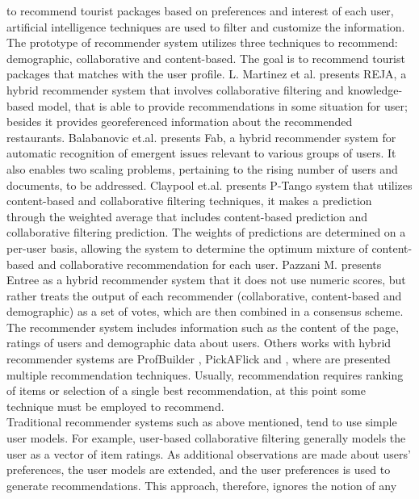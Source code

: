 to recommend tourist packages  based on preferences and interest 
of each user, artificial intelligence
techniques are used to filter and customize the information. The
prototype of recommender system utilizes three techniques to
recommend: demographic, collaborative and content-based. The goal is
to recommend tourist packages that matches with the user profile.
L. Martinez et al.\cite{martinez2009reja} presents REJA, a hybrid
recommender system that involves collaborative filtering and
knowledge-based model, that is able to provide recommendations in some
situation for user; besides it provides georeferenced information
about the recommended restaurants.
Balabanovic et.al.\cite{balabanovic1997fab} presents
Fab, a hybrid recommender system for automatic recognition of
emergent issues relevant to various groups of users. It also enables
two scaling problems, pertaining to the rising number of users and
documents, to be addressed. Claypool et.al.\cite{claypool1999combining} 
presents P-Tango system that utilizes content-based and collaborative
filtering techniques, it makes a prediction through the weighted
average that includes content-based prediction and collaborative
filtering prediction. The weights of predictions are determined on a
per-user basis, allowing the system to determine the optimum mixture
of content-based and collaborative recommendation for each user.
Pazzani M.\cite{pazzani1999framework} presents Entree as a hybrid
recommender system that it does not use numeric scores, but rather
treats the output of each recommender (collaborative, content-based
and demographic) as a set of votes, which are then combined in a
consensus scheme. The recommender system includes information such as
the content of the page, ratings of users and demographic data about
users. Others works with hybrid recommender systems are ProfBuilder
\cite{al1999semantic}, PickAFlick\cite{burke1999integrating}  and
\cite{tran2000hybrid}, where are presented multiple recommendation
techniques. Usually, recommendation requires ranking of
items or selection of a single best recommendation, at this point some
technique must be employed to recommend. \\ 
Traditional recommender systems such as above mentioned, tend to use
simple user models. For example, user-based collaborative filtering
generally models the user as a vector of item ratings. As additional
observations are made about users’ preferences, the user models are
extended, and the user preferences is used to generate
recommendations. This approach, therefore, ignores the notion of any
